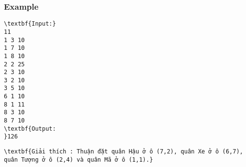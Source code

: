 \subsubsection{Example}
\begin{verbatim}
\textbf{Input:}
11
1 3 10
1 7 10
1 8 10
2 2 25
2 3 10
3 2 10
3 5 10
6 1 10
8 1 11
8 3 10
8 7 10
\textbf{Output:
}126\end{verbatim}
\begin{verbatim}
\textbf{Giải thích : Thuận đặt quân Hậu ở ô (7,2), quân Xe ở ô (6,7), quân Tượng ở ô (2,4) và quân Mã ở ô (1,1).}\end{verbatim}
